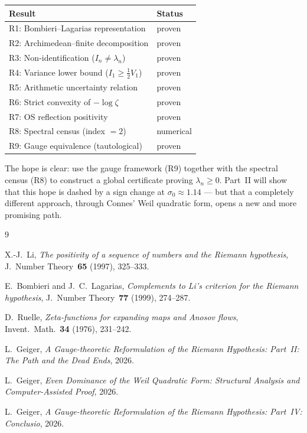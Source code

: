 \documentclass[12pt,a4paper]{article}
\theoremstyle{definition}
\theoremstyle{remark}
\begin{document}
\begin{center}
\renewcommand{\arraystretch}{1.15}
\begin{tabular}{ll}
\toprule
\textbf{Result} & \textbf{Status} \\
\midrule
R1: Bombieri--Lagarias representation & proven \\
R2: Archimedean--finite decomposition & proven \\
R3: Non-identification ($I_n \neq \lambda_n$) & proven \\
R4: Variance lower bound ($I_1 \geq \frac{1}{2}V_1$) & proven \\
R5: Arithmetic uncertainty relation & proven \\
R6: Strict convexity of $-\log\zeta$ & proven \\
R7: OS reflection positivity & proven \\
R8: Spectral census (index $= 2$) & numerical \\
R9: Gauge equivalence (tautological) & proven \\
\bottomrule
\end{tabular}
\end{center}

The hope is clear: use the gauge framework (R9) together with the spectral census (R8) to construct a global certificate proving $\lambda_n \geq 0$. Part~II will show that this hope is dashed by a sign change at $\sigma_0 \approx 1.14$ --- but that a completely different approach, through Connes' Weil quadratic form, opens a new and more promising path.


\begin{thebibliography}{9}

X.-J.~Li, \emph{The positivity of a sequence of numbers and the Riemann hypothesis}, J.~Number Theory~\textbf{65} (1997), 325--333.

E.~Bombieri and J.~C.~Lagarias, \emph{Complements to Li's criterion for the Riemann hypothesis}, J.~Number Theory~\textbf{77} (1999), 274--287.

D.~Ruelle, \emph{Zeta-functions for expanding maps and Anosov flows}, Invent.~Math.~\textbf{34} (1976), 231--242.

L.~Geiger, \emph{A Gauge-theoretic Reformulation of the Riemann Hypothesis: Part~II: The Path and the Dead Ends}, 2026.

L.~Geiger, \emph{Even Dominance of the Weil Quadratic Form: Structural Analysis and Computer-Assisted Proof}, 2026.

L.~Geiger, \emph{A Gauge-theoretic Reformulation of the Riemann Hypothesis: Part~IV: Conclusio}, 2026.

\end{thebibliography}
\end{document}

